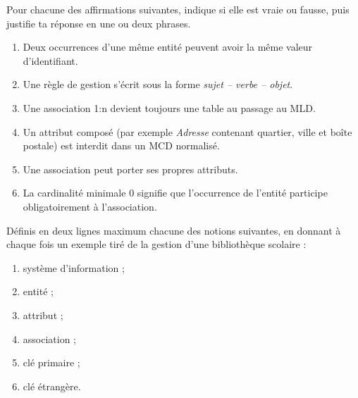 \documentclass[11pt]{article}
\begin{document}
\begin{exercice}
Pour chacune des affirmations suivantes, indique si elle est vraie ou fausse, puis justifie ta réponse en une ou deux phrases.

\begin{enumerate}
  \item Deux occurrences d'une même entité peuvent avoir la même valeur d'identifiant.
  \item Une règle de gestion s'écrit sous la forme \emph{sujet -- verbe -- objet}.
  \item Une association 1:n devient toujours une table au passage au MLD.
  \item Un attribut composé (par exemple \emph{Adresse} contenant quartier, ville et boîte postale) est interdit dans un MCD normalisé.
  \item Une association peut porter ses propres attributs.
  \item La cardinalité minimale 0 signifie que l'occurrence de l'entité participe obligatoirement à l'association.
\end{enumerate}
\end{exercice}

\begin{exercice}
Définis en deux lignes maximum chacune des notions suivantes, en donnant à chaque fois un exemple tiré de la gestion d'une bibliothèque scolaire :
\begin{enumerate}
  \item système d'information ;
  \item entité ;
  \item attribut ;
  \item association ;
  \item clé primaire ;
  \item clé étrangère.
\end{enumerate}
\end{exercice}
\end{document}
